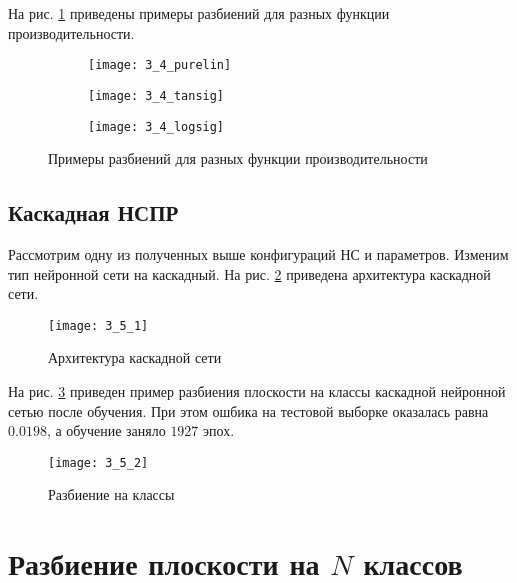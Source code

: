 На рис. \ref{fig:3_4} приведены примеры разбиений для разных функции производительности.
\begin{figure}[H]
\begin{center}
	\begin{subfigure}[b]{0.49\textwidth}
		\texttt{[image: 3\_4\_purelin]}
		\caption{}
	\end{subfigure}
	\begin{subfigure}[b]{0.49\textwidth}
		\texttt{[image: 3\_4\_tansig]}
		\caption{}
	\end{subfigure}
	\begin{subfigure}[b]{0.49\textwidth}
		\texttt{[image: 3\_4\_logsig]}
		\caption{}
	\end{subfigure}
	\caption{Примеры разбиений для разных функции производительности}
	\label{fig:3_4}
\end{center}
\end{figure}

\subsection{Каскадная НСПР}

Рассмотрим одну из полученных выше конфигураций НС и параметров. Изменим тип нейронной сети на каскадный. На рис. \ref{fig:3_5_1} приведена архитектура каскадной сети.
\begin{figure}[H]
\begin{center}
	\texttt{[image: 3\_5\_1]}
	\caption{Архитектура каскадной сети}
	\label{fig:3_5_1}
\end{center}
\end{figure}

На рис. \ref{fig:3_5_2} приведен пример разбиения плоскости на классы каскадной нейронной сетью после обучения. При этом ошбика  на тестовой выборке оказалась равна $0.0198$, а обучение заняло $1927$ эпох.
\begin{figure}[H]
\begin{center}
	\texttt{[image: 3\_5\_2]}
	\caption{Разбиение на классы}
	\label{fig:3_5_2}
\end{center}
\end{figure}

\section{Разбиение плоскости на $N$ классов}

